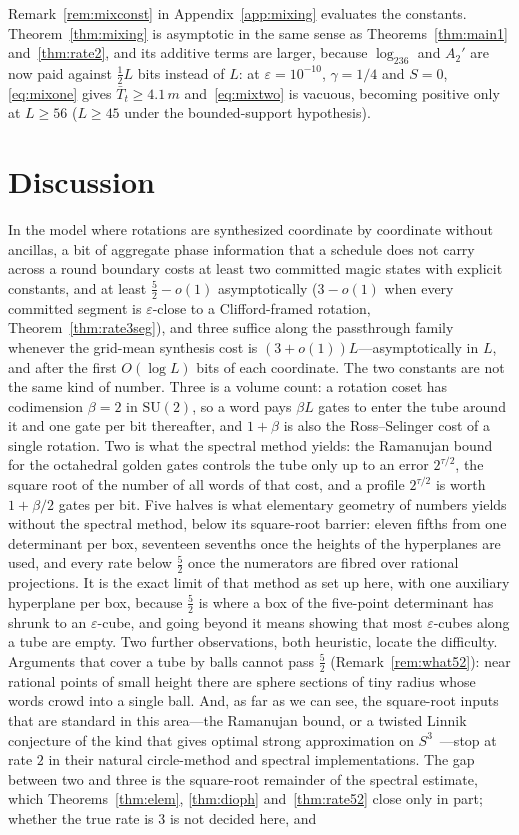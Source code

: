 \documentclass[aps,prx,twocolumn,superscriptaddress,nofootinbib,longbibliography]{revtex4-2}
\theoremstyle{plain}
\theoremstyle{definition}
\theoremstyle{remark}
\newcommand{\SU}{\mathrm{SU}(2)}
\begin{document}
Remark~\ref{rem:mixconst} in Appendix~\ref{app:mixing} evaluates the constants. Theorem~\ref{thm:mixing} is asymptotic in the same sense as Theorems~\ref{thm:main1} and~\ref{thm:rate2}, and its additive terms are larger, because $\log_236$ and $A_2'$ are now paid against $\tfrac12L$ bits instead of $L$: at $\varepsilon=10^{-10}$, $\gamma=1/4$ and $S=0$, \eqref{eq:mixone} gives $\bar T_t\ge4.1\,m$ and~\eqref{eq:mixtwo} is vacuous, becoming positive only at $L\ge56$ ($L\ge45$ under the bounded-support hypothesis).

\section{Discussion}\label{sec:disc}

In the model where rotations are synthesized coordinate by coordinate without ancillas, a bit of aggregate phase information that a schedule does not carry across a round boundary costs at least two committed magic states with explicit constants, and at least $\tfrac52-o(1)$ asymptotically ($3-o(1)$ when every committed segment is $\varepsilon$-close to a Clifford-framed rotation, Theorem~\ref{thm:rate3seg}), and three suffice along the passthrough family whenever the grid-mean synthesis cost is $(3+o(1))L$---asymptotically in $L$, and after the first $O(\log L)$ bits of each coordinate. The two constants are not the same kind of number. Three is a volume count: a rotation coset has codimension $\beta=2$ in $\SU$, so a word pays $\beta L$ gates to enter the tube around it and one gate per bit thereafter, and $1+\beta$ is also the Ross--Selinger cost of a single rotation. Two is what the spectral method yields: the Ramanujan bound for the octahedral golden gates controls the tube only up to an error $2^{\tau/2}$, the square root of the number of all words of that cost, and a profile $2^{\tau/2}$ is worth $1+\beta/2$ gates per bit. Five halves is what elementary geometry of numbers yields without the spectral method, below its square-root barrier: eleven fifths from one determinant per box, seventeen sevenths once the heights of the hyperplanes are used, and every rate below $\tfrac52$ once the numerators are fibred over rational projections. It is the exact limit of that method as set up here, with one auxiliary hyperplane per box, because $\tfrac52$ is where a box of the five-point determinant has shrunk to an $\varepsilon$-cube, and going beyond it means showing that most $\varepsilon$-cubes along a tube are empty. Two further observations, both heuristic, locate the difficulty. Arguments that cover a tube by balls cannot pass $\tfrac52$ (Remark~\ref{rem:what52}): near rational points of small height there are sphere sections of tiny radius whose words crowd into a single ball. And, as far as we can see, the square-root inputs that are standard in this area---the Ramanujan bound, or a twisted Linnik conjecture of the kind that gives optimal strong approximation on $S^3$~\cite{BKS}---stop at rate $2$ in their natural circle-method and spectral implementations. The gap between two and three is the square-root remainder of the spectral estimate, which Theorems~\ref{thm:elem}, \ref{thm:dioph} and~\ref{thm:rate52} close only in part; whether the true rate is $3$ is not decided here, and 
\end{document}
